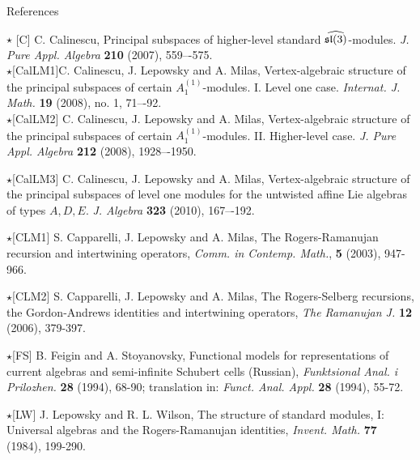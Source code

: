 \documentclass{beamer}
\begin{document}
\begin{frame}{References}
\begin{tiny}
$\star$ [C] C. Calinescu, Principal subspaces of higher-level standard $\widehat{\frak{sl}(3)}$-modules. {\em J. Pure Appl. Algebra} {\bf 210} (2007),  559–-575.\\ 
\vspace{0.1in}
$\star$[CalLM1]C. Calinescu, J. Lepowsky and A. Milas,
Vertex-algebraic structure of the principal subspaces of certain $A_1^{(1)}$-modules. I. Level one case. {\em Internat. J. Math.} {\bf 19} (2008), no. 1, 71–-92. \\
\vspace{0.1in}
$\star$[CalLM2] C. Calinescu, J. Lepowsky and A. Milas,
Vertex-algebraic structure of the principal subspaces of certain $A_1^{(1)}$-modules. II. Higher-level case. {\em J. Pure Appl. Algebra} {\bf 212} (2008), 1928–-1950.\\
\vspace{0.1in}

$\star$[CalLM3] C. Calinescu, J. Lepowsky and A. Milas,
Vertex-algebraic structure of the principal subspaces of level one modules for the untwisted affine Lie algebras of types $A, D, E$. {\em J. Algebra} {\bf 323} (2010), 167–-192.\\
\vspace{0.1in}

$\star$[CLM1] S. Capparelli, J. Lepowsky and A. Milas, The
Rogers-Ramanujan recursion and intertwining operators, {\em
Comm. in Contemp. Math.}, {\bf 5} (2003), 947-966.\\
\vspace{0.1in}

$\star$[CLM2] S. Capparelli, J. Lepowsky and A. Milas, The
Rogers-Selberg recursions, the Gordon-Andrews identities and
intertwining operators, {\em The Ramanujan J.} {\bf 12} (2006),
379-397.\\
\vspace{0.1in}

$\star$[FS] B. Feigin and A. Stoyanovsky, Functional models for
representations of current algebras and semi-infinite Schubert cells
(Russian), {\em Funktsional Anal. i Prilozhen.} {\bf 28} (1994),
68-90; translation in: {\em Funct. Anal. Appl.} {\bf 28} (1994),
55-72.

\vspace{0.1in}
$\star$[LW] J. Lepowsky and R. L. Wilson, The structure of
  standard modules, I: Universal algebras and the Rogers-Ramanujan
  identities, {\em Invent. Math.} {\bf 77} (1984), 199-290.
\end{tiny}
\end{frame}
\end{document}
